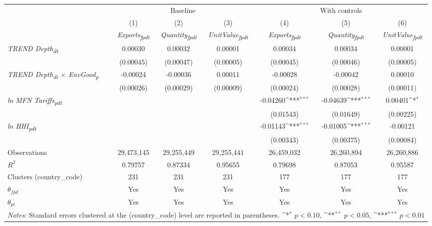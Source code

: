 {
\def\sym#1{\ifmmode^{#1}\else\(^{#1}\)\fi}
\begin{tabular}{l*{6}{c}}
\toprule
&\multicolumn{3}{c}{Baseline}&\multicolumn{3}{c}{With controls}\\\cmidrule(lr){2-4}\cmidrule(lr){5-7}
&(1)&(2)&(3)&(4)&(5)&(6)\\
&\textit{Exports\textsubscript{fpdt}}&\textit{Quantity\textsubscript{fpdt}}&\textit{UnitValue\textsubscript{fpdt}}&\textit{Exports\textsubscript{fpdt}}&\textit{Quantity\textsubscript{fpdt}}&\textit{UnitValue\textsubscript{fpdt}}\\
\midrule
\textit{TREND Depth\textsubscript{dt}} & 0.00030 & 0.00032 & 0.00001 & 0.00034 & 0.00034 & 0.00001\\
 & (0.00045) & (0.00047) & (0.00005) & (0.00045) & (0.00046) & (0.00005)\\
\addlinespace
\textit{TREND Depth\textsubscript{dt} $\times$ EnvGood\textsubscript{p}} & -0.00024 & -0.00036 & 0.00011 & -0.00028 & -0.00042 & 0.00010\\
 & (0.00026) & (0.00029) & (0.00009) & (0.00024) & (0.00028) & (0.00011)\\
\addlinespace
\textit{ln MFN Tariffs\textsubscript{pdt}} &  &  &  & -0.04260\sym{***} & -0.04639\sym{***} & 0.00401\sym{*}\\
 &  &  &  & (0.01543) & (0.01649) & (0.00225)\\
\addlinespace
\textit{ln HHI\textsubscript{pdt}} &  &  &  & -0.01143\sym{***} & -0.01005\sym{***} & -0.00121\\
 &  &  &  & (0.00343) & (0.00375) & (0.00084)\\
\midrule
Observations & 29,473,145 & 29,255,449 & 29,255,441 & 26,459,032 & 26,260,894 & 26,260,886\\
$R^{2}$ & 0.79757 & 0.87334 & 0.95655 & 0.79698 & 0.87053 & 0.95587\\
Clusters (country_code) & 231 & 231 & 231 & 177 & 177 & 177\\
$\theta_{fpd}$ & Yes & Yes & Yes & Yes & Yes & Yes\\
$\theta_{pt}$ & Yes & Yes & Yes & Yes & Yes & Yes\\
\bottomrule
\multicolumn{7}{l}{\footnotesize \textit{Notes}: Standard errors clustered at the (country_code) level are reported in parentheses. \sym{*} \(p<0.10\), \sym{**} \(p<0.05\), \sym{***} \(p<0.01\)}\\
\end{tabular}
}
